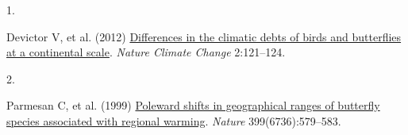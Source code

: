 \documentclass[9pt,twocolumn,twoside,]{pnas-new}
\newlength{\cslhangindent}
\newlength{\csllabelwidth}
\newenvironment{CSLReferences}[2] %
 {\begin{list}{}{%
  \setlength{\itemindent}{0pt}
  \setlength{\leftmargin}{0pt}
  \setlength{\parsep}{0pt}
  \ifodd #1
   \setlength{\leftmargin}{\cslhangindent}
   \setlength{\itemindent}{-1\cslhangindent}
  \fi
  \setlength{\itemsep}{#2\baselineskip}}}
 {\end{list}}
\newcommand{\CSLLeftMargin}[1]{\parbox[t]{\csllabelwidth}{#1}}
\newcommand{\CSLRightInline}[1]{\parbox[t]{\linewidth - \csllabelwidth}{#1}\break}
\begin{document}
\showmatmethods
\showacknow
\pnasbreak

\label{refs}
\begin{CSLReferences}{0}{1}
\CSLLeftMargin{1. }%
\CSLRightInline{Devictor V, et al. (2012)
\href{https://doi.org/10.1038/NCLIMATE1347}{Differences in the climatic
debts of birds and butterflies at a continental scale}. \emph{Nature
Climate Change} 2:121--124.}

\CSLLeftMargin{2. }%
\CSLRightInline{Parmesan C, et al. (1999)
\href{https://doi.org/10.1038/21181}{Poleward shifts in geographical
ranges of butterfly species associated with regional warming}.
\emph{Nature} 399(6736):579--583.}

\end{CSLReferences}



% 
\end{document}
